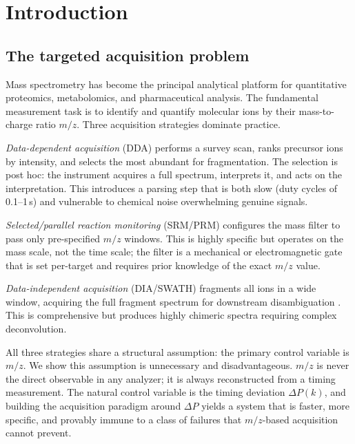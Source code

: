 \documentclass[twocolumn,10pt,a4paper]{article}
\theoremstyle{thmstyle}
\theoremstyle{definition}
\theoremstyle{remark}
\newcommand{\DP}{\Delta P}
\begin{document}
\tableofcontents

\section{Introduction}
\label{sec:intro}

\subsection{The targeted acquisition problem}

Mass spectrometry has become the principal analytical platform for
quantitative proteomics, metabolomics, and pharmaceutical analysis. The
fundamental measurement task is to identify and quantify molecular ions
by their mass-to-charge ratio $m/z$. Three acquisition strategies
dominate practice.

\emph{Data-dependent acquisition} (DDA) performs a survey scan, ranks
precursor ions by intensity, and selects the most abundant for
fragmentation. The selection is post hoc: the instrument acquires a full
spectrum, interprets it, and acts on the interpretation. This introduces
a parsing step that is both slow (duty cycles of 0.1--1\,s) and
vulnerable to chemical noise overwhelming genuine signals.

\emph{Selected/parallel reaction monitoring} (SRM/PRM) configures the
mass filter to pass only pre-specified $m/z$ windows. This is highly
specific but operates on the mass scale, not the time scale; the filter
is a mechanical or electromagnetic gate that is set per-target and
requires prior knowledge of the exact $m/z$ value.

\emph{Data-independent acquisition} (DIA/SWATH) fragments all ions in a
wide window, acquiring the full fragment spectrum for downstream
disambiguation \citep{gillet2012}. This is comprehensive but produces
highly chimeric spectra requiring complex deconvolution.

All three strategies share a structural assumption: the primary control
variable is $m/z$. We show this assumption is unnecessary and
disadvantageous. $m/z$ is never the direct observable in any analyzer;
it is always reconstructed from a timing measurement. The natural control
variable is the timing deviation $\DP(k)$, and building the acquisition
paradigm around $\DP$ yields a system that is faster, more specific, and
provably immune to a class of failures that $m/z$-based acquisition
cannot prevent.
\end{document}
